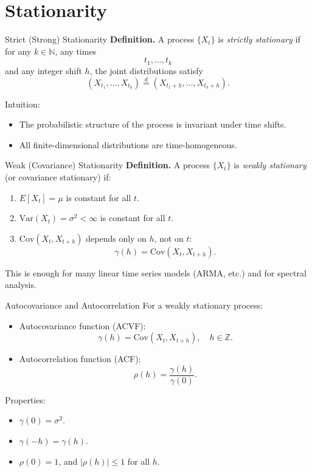 \documentclass{beamer}
\begin{document}
\section{Stationarity}

\begin{frame}{Strict (Strong) Stationarity}
  \textbf{Definition.}  
  A process $\{X_t\}$ is \emph{strictly stationary} if for any $k \in \mathbb{N}$, any times
  \[
    t_1, \dots, t_k
  \]
  and any integer shift $h$, the joint distributions satisfy
  \[
    (X_{t_1}, \dots, X_{t_k}) \overset{d}{=} (X_{t_1+h}, \dots, X_{t_k+h}).
  \]

  \vspace{0.3cm}
  Intuition:
  \begin{itemize}
    \item The probabilistic structure of the process is invariant under time shifts.
    \item All finite-dimensional distributions are time-homogeneous.
  \end{itemize}
\end{frame}

\begin{frame}{Weak (Covariance) Stationarity}
  \textbf{Definition.}  
  A process $\{X_t\}$ is \emph{weakly stationary} (or covariance stationary) if:
  \begin{enumerate}
    \item $E[X_t] = \mu$ is constant for all $t$.
    \item $\mathrm{Var}(X_t) = \sigma^2 < \infty$ is constant for all $t$.
    \item $\mathrm{Cov}(X_t, X_{t+h})$ depends only on $h$, not on $t$:
      \[
        \gamma(h) = \mathrm{Cov}(X_t, X_{t+h}).
      \]
  \end{enumerate}

  \vspace{0.3cm}
  This is enough for many linear time series models (ARMA, etc.) and for spectral analysis.
\end{frame}

\begin{frame}{Autocovariance and Autocorrelation}
  For a weakly stationary process:
  \begin{itemize}
    \item Autocovariance function (ACVF):
      \[
        \gamma(h) = \mathrm{Cov}(X_t, X_{t+h}), \quad h \in \mathbb{Z}.
      \]
    \item Autocorrelation function (ACF):
      \[
        \rho(h) = \frac{\gamma(h)}{\gamma(0)}.
      \]
  \end{itemize}

  \vspace{0.3cm}
  Properties:
  \begin{itemize}
    \item $\gamma(0) = \sigma^2$.
    \item $\gamma(-h) = \gamma(h)$.
    \item $\rho(0) = 1$, and $|\rho(h)| \le 1$ for all $h$.
  \end{itemize}
\end{frame}
\end{document}
